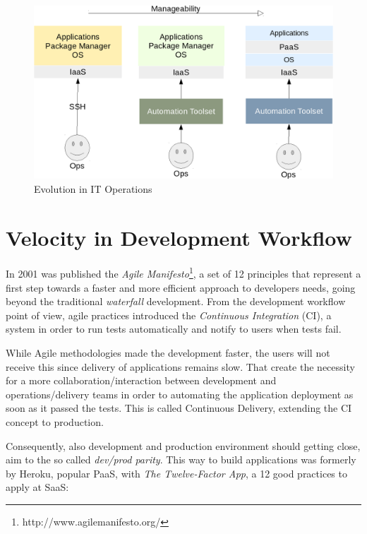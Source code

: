 \begin{figure}[htbp]
\centering
\includegraphics{media/ch2-paas.png}
\caption{Evolution in IT Operations}
\end{figure}

\section{Velocity in Development
Workflow}\label{velocity-in-development-workflow}

In 2001 was published the \textit{Agile Manifesto}\footnote{http://www.agilemanifesto.org/}, a set of 12 principles that represent a first step towards a faster and more efficient approach to developers needs, going beyond the traditional \textit{waterfall} development. From the development workflow point of view, agile practices introduced the \textit{Continuous Integration} (CI), a system in order to run tests automatically and notify to users when tests fail.

While Agile methodologies made the development faster, the users will not receive this since delivery of applications remains slow. That create the necessity for a more collaboration/interaction between development and operations/delivery teams in order to automating the application deployment as soon as it passed the tests. This is called Continuous Delivery\cite{ContinuousDelivery}, extending the CI concept to production.

Consequently, also development and production environment should getting close, aim to the so called \textit{dev/prod parity}. This way to build applications was formerly by Heroku, popular PaaS, with \textit{The
Twelve-Factor App}\cite{TheTwelveFactors}, a 12 good practices to apply
at SaaS:

